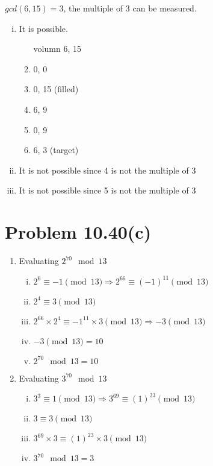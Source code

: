 \documentclass{article}
\def\math#1{$#1$}
\begin{document}
\math{gcd(6, 15) = 3}, the multiple of 3 can be measured.

\begin{enumerate}[i)]
    \item It is possible. 
        \begin{enumerate}[(1)]
            \item [volumn] 6, 15
            \item 0, 0
            \item 0, 15 (filled)
            \item 6, 9
            \item 0, 9
            \item 6, 3 (target)
        \end{enumerate}
    \item It is not possible since 4 is not the multiple of 3
    \item It is not possible since 5 is not the multiple of 3
\end{enumerate}

\section{Problem 10.40(c)}
\begin{enumerate}[1)]
    \item Evaluating \math{2^{70} \mod {13}}
        \begin{enumerate}[i)]
            \item \math{2^6 \equiv -1 \pmod {13} \Rightarrow 2^{66} \equiv (-1)^{11} \pmod {13}}
            \item \math{2^4 \equiv 3 \pmod{13}}
            \item \math{2^{66} \times 2^4 \equiv -1^{11} \times 3 \pmod {13} \Rightarrow -3 \pmod {13}}
            \item \math{-3 \pmod {13} = 10}
            \item \math{2^{70} \mod {13} = 10}
        \end{enumerate}
    \item Evaluating \math{3^{70} \mod {13}}
        \begin{enumerate}[i)]
            \item \math{3^3 \equiv 1 \pmod {13} \Rightarrow 3^{69} \equiv (1)^{23} \pmod {13}}
            \item \math{3 \equiv 3 \pmod {13}}
            \item \math{3^{69} \times 3 \equiv (1)^{23} \times 3 \pmod {13}}
            \item \math{3^{70} \mod {13} = 3}
        \end{enumerate}
\end{enumerate}
\end{document}
